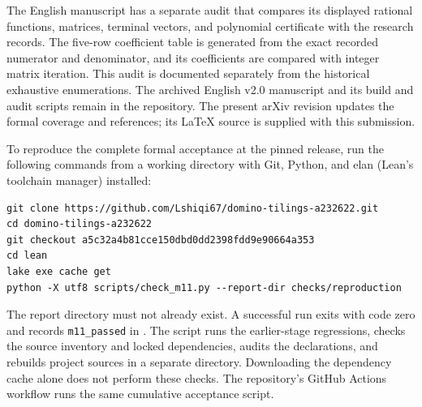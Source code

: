 The English manuscript has a separate audit that compares
its displayed rational functions, matrices, terminal vectors,
and polynomial certificate with the research records.
The five-row coefficient table is generated from the exact
recorded numerator and denominator, and its coefficients are
compared with integer matrix iteration.
This audit is documented separately from the historical
exhaustive enumerations.
The archived English v2.0 manuscript and its build and audit scripts
remain in the repository. The present arXiv revision updates the formal
coverage and references; its LaTeX source is supplied with this submission.

To reproduce the complete formal acceptance at the pinned release,
run the following commands from a working directory with Git, Python,
and elan (Lean's toolchain manager) installed:
\begin{verbatim}
git clone https://github.com/Lshiqi67/domino-tilings-a232622.git
cd domino-tilings-a232622
git checkout a5c32a4b81cce150dbd0dd2398fdd9e90664a353
cd lean
lake exe cache get
python -X utf8 scripts/check_m11.py --report-dir checks/reproduction
\end{verbatim}
The report directory must not already exist. A successful run exits with
code zero and records \texttt{m11\_passed} in .
The script runs the earlier-stage regressions, checks the source inventory
and locked dependencies, audits the declarations, and rebuilds project
sources in a separate directory. Downloading the dependency cache alone
does not perform these checks. The repository's GitHub Actions workflow
runs the same cumulative acceptance script.
